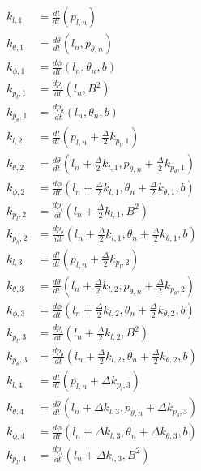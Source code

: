 \documentclass{article}
\begin{document}
\begin{align*}
k_{l,1} &= \frac{d l}{d t}(p_{l,n})\\
k_{\theta,1} &= \frac{d \theta}{d t}(l_{n},p_{\theta,n})\\
k_{\phi,1} &= \frac{d \phi}{d t}(l_{n},\theta_{n},b)\\
k_{p_{l},1} &= \frac{d p_{l}}{d t}(l_{n}, B^{2})\\
k_{p_{\theta},1} &= \frac{d p_{\theta}}{d t}(l_{n}, \theta_{n}, b)\\
k_{l,2} &= \frac{d l}{d t}(p_{l,n}+\frac{\Delta}{2} k_{p_{l},1})\\
k_{\theta,2} &= \frac{d \theta}{d t}(l_{n}+\frac{\Delta}{2} k_{l,1},p_{\theta,n}+\frac{\Delta}{2} k_{p_{\theta},1})\\
k_{\phi,2} &= \frac{d \phi}{d t}(l_{n}+\frac{\Delta}{2} k_{l,1},\theta_n+\frac{\Delta}{2} k_{\theta,1},b)\\
k_{p_{l},2} &= \frac{d p_{l}}{d t}(l_{n}+\frac{\Delta}{2} k_{l,1}, B^{2})\\
k_{p_{\theta},2} &= \frac{d p_{\theta}}{d t}(l_{n}+\frac{\Delta}{2} k_{l,1}, \theta_{n} +\frac{\Delta}{2} k_{\theta,1}, b)\\
k_{l,3} &= \frac{d l}{d t}(p_{l,n}+\frac{\Delta}{2} k_{p_{l},2})\\
k_{\theta,3} &= \frac{d \theta}{d t}(l_{n}+\frac{\Delta}{2} k_{l,2},p_{\theta,n}+\frac{\Delta}{2} k_{p_{\theta},2})\\
k_{\phi,3} &= \frac{d \phi}{d t}(l_{n}+\frac{\Delta}{2} k_{l,2},\theta_{n}+\frac{\Delta}{2} k_{\theta,2},b)\\
k_{p_{l},3} &= \frac{d p_{l}}{d t}(l_{n}+\frac{\Delta}{2} k_{l,2}, B^{2})\\
k_{p_{\theta},3} &= \frac{d p_{\theta}}{d t}(l_{n}+\frac{\Delta}{2} k_{l,2}, \theta_{n} +\frac{\Delta}{2} k_{\theta,2}, b)\\
k_{l,4} &= \frac{d l}{d t}(p_{l,n}+\Delta k_{p_{l},3})\\
k_{\theta,4} &= \frac{d \theta}{d t}(l_{n}+\Delta k_{l,3},p_{\theta,n}+\Delta k_{p_{\theta},3})\\
k_{\phi,4} &= \frac{d \phi}{d t}(l_{n}+\Delta k_{l,3},\theta_{n}+\Delta k_{\theta,3},b)\\
k_{p_{l},4} &= \frac{d p_{l}}{d t}(l_{n}+\Delta k_{l,3}, B^{2})\\
\end{align*}
\end{document}
